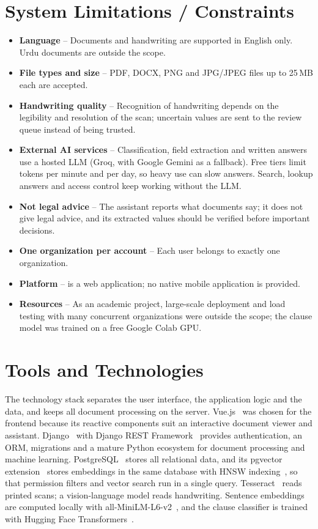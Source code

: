 \section{System Limitations / Constraints}
\begin{itemize}
\item \textbf{Language} -- Documents and handwriting are supported in English only. Urdu documents are
outside the scope.
\item \textbf{File types and size} -- PDF, DOCX, PNG and JPG/JPEG files up to 25\,MB each are accepted.
\item \textbf{Handwriting quality} -- Recognition of handwriting depends on the legibility and resolution
of the scan; uncertain values are sent to the review queue instead of being trusted.
\item \textbf{External AI services} -- Classification, field extraction and written answers use a hosted
LLM (Groq, with Google Gemini as a fallback). Free tiers limit tokens per minute and per day, so heavy
use can slow answers. Search, lookup answers and access control keep working without the LLM.
\item \textbf{Not legal advice} -- The assistant reports what documents say; it does not give legal
advice, and its extracted values should be verified before important decisions.
\item \textbf{One organization per account} -- Each user belongs to exactly one organization.
\item \textbf{Platform} -- \sysname{} is a web application; no native mobile application is provided.
\item \textbf{Resources} -- As an academic project, large-scale deployment and load testing with many
concurrent organizations were outside the scope; the clause model was trained on a free Google Colab GPU.
\end{itemize}

\section{Tools and Technologies}
The technology stack separates the user interface, the application logic and the data, and keeps
all document processing on the server. Vue.js~\cite{vue} was chosen for the frontend because its
reactive components suit an interactive document viewer and assistant. Django~\cite{django} with
Django REST Framework~\cite{drf} provides authentication, an ORM, migrations and a mature Python
ecosystem for document processing and machine learning. PostgreSQL~\cite{postgres} stores all
relational data, and its pgvector extension~\cite{pgvector} stores embeddings in the same database
with HNSW indexing~\cite{malkov2018hnsw}, so that permission filters and vector search run in a
single query. Tesseract~\cite{smith2007tesseract} reads printed scans; a vision-language model
reads handwriting. Sentence embeddings are computed locally with
all-MiniLM-L6-v2~\cite{reimers2019sbert,wang2020minilm}, and the clause classifier is trained with
Hugging Face Transformers~\cite{wolf2020transformers}.


